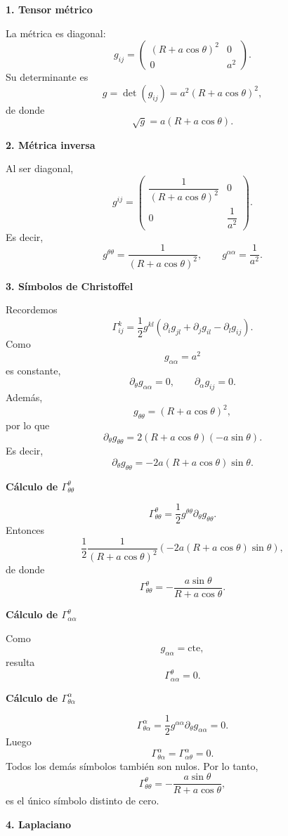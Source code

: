 \documentclass[11pt,spanish]{article}
\begin{document}
{\bf 1. Tensor métrico}

La métrica es diagonal:
$$
g_{ij}=
\begin{pmatrix}
(R+a\cos\theta)^2 & 0\\
0 & a^2
\end{pmatrix}.
$$
Su determinante es
$$
g=\det(g_{ij})
=a^2(R+a\cos\theta)^2,
$$
de donde
$$
\sqrt g
=a(R+a\cos\theta).
$$

{\bf 2. Métrica inversa}

Al ser diagonal,
$$
g^{ij}=
\begin{pmatrix}
\dfrac1{(R+a\cos\theta)^2} & 0\\
0 & \dfrac1{a^2}
\end{pmatrix}.
$$
Es decir,
$$
\boxed{
g^{\theta\theta}
=\frac1{(R+a\cos\theta)^2},
\qquad
g^{\alpha\alpha}
=\frac1{a^2}.
}
$$

{\bf 3. Símbolos de Christoffel}

Recordemos
$$
\Gamma^k_{ij}
=
\frac12
g^{kl}
\left(
\partial_i g_{jl}
+\partial_j g_{il}
-\partial_l g_{ij}
\right).
$$
Como
$$
g_{\alpha\alpha}=a^2
$$
es constante,
$$
\partial_\theta g_{\alpha\alpha}=0,
\qquad
\partial_\alpha g_{ij}=0.
$$
Además,
$$
g_{\theta\theta}
=(R+a\cos\theta)^2,
$$
por lo que
$$
\partial_\theta g_{\theta\theta}
=
2(R+a\cos\theta)(-a\sin\theta).
$$
Es decir,
$$
\partial_\theta g_{\theta\theta}
=
-2a(R+a\cos\theta)\sin\theta.
$$

{\bf Cálculo de $\Gamma^\theta_{\theta\theta}$}

$$
\Gamma^\theta_{\theta\theta}
=
\frac12
g^{\theta\theta}
\partial_\theta g_{\theta\theta}.
$$
Entonces
$$
\frac12
\frac1{(R+a\cos\theta)^2}
(-2a(R+a\cos\theta)\sin\theta),
$$
de donde
$$
\boxed{
\Gamma^\theta_{\theta\theta}
=
-\frac{a\sin\theta}
{R+a\cos\theta}.
}
$$

{\bf Cálculo de $\Gamma^\theta_{\alpha\alpha}$}

Como
$$
g_{\alpha\alpha}
=\text{cte},
$$
resulta
$$
\boxed{
\Gamma^\theta_{\alpha\alpha}=0.
}
$$

{\bf Cálculo de $\Gamma^\alpha_{\theta\alpha}$}

$$
\Gamma^\alpha_{\theta\alpha}
=
\frac12
g^{\alpha\alpha}
\partial_\theta g_{\alpha\alpha}=0.
$$
Luego
$$
\boxed{
\Gamma^\alpha_{\theta\alpha}
=
\Gamma^\alpha_{\alpha\theta}
=0.
}
$$
Todos los demás símbolos también son nulos.
Por lo tanto,
$$
\boxed{
\Gamma^\theta_{\theta\theta}
=
-\frac{a\sin\theta}
{R+a\cos\theta},
}
$$
es el único símbolo distinto de cero.

{\bf 4. Laplaciano}
\end{document}
